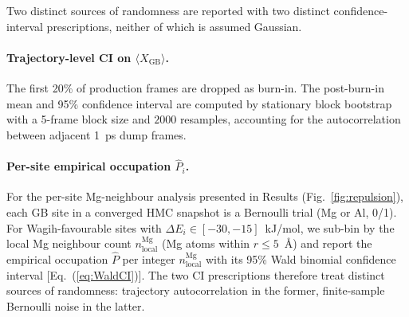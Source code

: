 Two distinct sources of randomness are reported with two distinct
confidence-interval prescriptions, neither of which is assumed Gaussian.

\paragraph*{Trajectory-level CI on $\langle X_\mathrm{GB}\rangle$.}
The first 20\% of production frames are dropped as burn-in. The
post-burn-in mean and 95\% confidence interval are computed by
stationary block bootstrap with a 5-frame block size and $2000$
resamples, accounting for the autocorrelation between adjacent
1~ps dump frames.

\paragraph*{Per-site empirical occupation $\hat P_i$.}
For the per-site Mg-neighbour analysis presented in Results
(Fig.~\ref{fig:repulsion}), each GB site in a converged HMC snapshot
is a Bernoulli trial (Mg or Al, 0/1). For Wagih-favourable sites with
$\Delta E_i \in [-30, -15]$~kJ/mol, we sub-bin by the local Mg
neighbour count $n^\mathrm{Mg}_\mathrm{local}$ (Mg atoms within
$r \leq 5$~\AA) and report the empirical occupation $\hat P$ per
integer $n^\mathrm{Mg}_\mathrm{local}$ with its 95\% Wald binomial
confidence interval [Eq.~(\ref{eq:WaldCI})]. The two CI prescriptions
therefore treat distinct sources of randomness: trajectory
autocorrelation in the former, finite-sample Bernoulli noise in the
latter.



